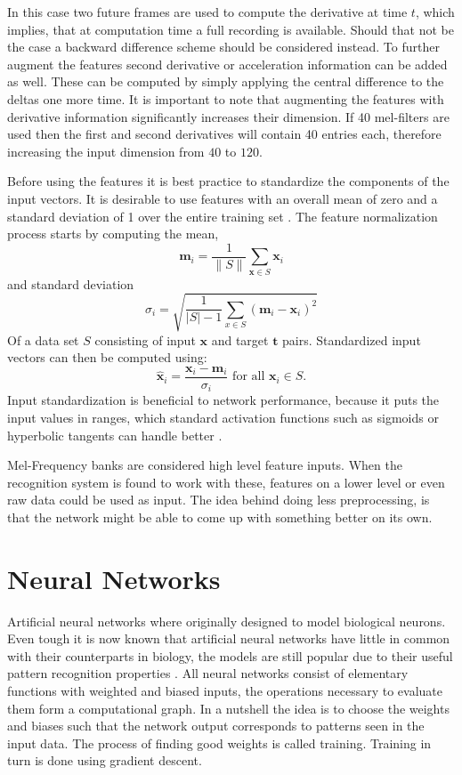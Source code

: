 In this case two future frames are used to compute the derivative at time $t$, which implies, that at computation time a full recording is available. Should that not be the case a backward difference scheme should be considered instead. To further augment the features second derivative or acceleration information can be added as well. These can be computed by simply applying the central difference to the deltas one more time. It is important to note that augmenting the features with derivative information significantly increases their dimension. If 40 mel-filters are used then the first and second derivatives will contain 40 entries each, therefore increasing the input dimension from $40$ to $120$.

Before using the features it is best practice to standardize the components of the input vectors. It is desirable to use features with an overall mean of zero and a standard deviation of 1 over the entire training set \cite[page 30]{Graves2008}. The feature normalization process starts by computing the mean,
\begin{equation}
\mathbf{m}_i = \frac{1}{\|S\|} \sum\limits_{\mathbf{x} \in S} \mathbf{x}_i
\end{equation}
and standard deviation
\begin{equation}
\sigma_i = \sqrt{\frac{1}{|S| - 1}\sum\limits_{x \in S}(\mathbf{m}_i - \mathbf{x}_i)^2}
\end{equation}
Of a data set $S$ consisting of input $\mathbf{x}$ and target $\mathbf{t}$ pairs. Standardized input vectors can then be computed using:
\begin{equation}
\hat{\mathbf{x}}_i = \frac{\mathbf{x}_i - \mathbf{m}_i}{\sigma_i} \text{  for all } \mathbf{x}_i \in S.
\end{equation}
Input standardization is beneficial to network performance, because it puts the input values in ranges, which standard activation functions such as sigmoids or hyperbolic tangents can handle better \cite[page 30]{Graves2008}.

Mel-Frequency banks are considered high level feature inputs. When the recognition system is found to work with these, features on a lower level or even raw data could be used as input. The idea behind doing less preprocessing, is that the network might be able to come up with something better on its own.

\section{Neural Networks}
Artificial neural networks where originally designed to model biological neurons. Even tough it is now known that artificial neural networks have little in common with their counterparts in biology, the models are still popular due to their useful pattern recognition properties \cite[page 13]{Graves2008}. All neural networks consist of elementary functions with weighted and biased inputs, the operations necessary to evaluate them form a computational graph. In a nutshell the idea is to choose the weights and biases such that the network output corresponds to patterns seen in the input data. The process of finding good weights is called training. Training in turn is done using gradient descent.

